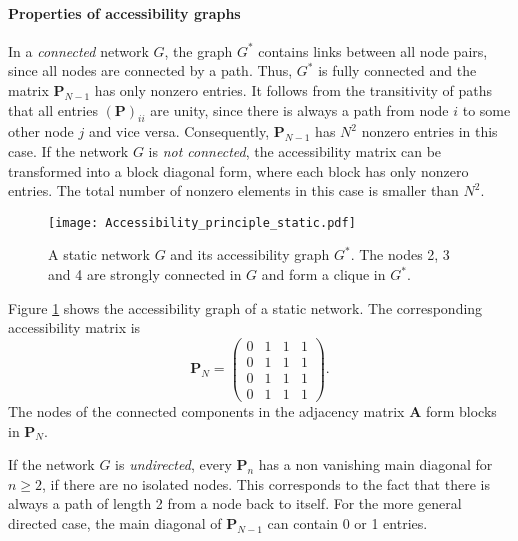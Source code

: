 \paragraph{Properties of accessibility graphs\color{Cayenne}{.}}
In a \emph{connected} network $G$, the graph $G^*$ contains links between all node pairs, since all nodes are connected by a path.
Thus, $G^*$ is fully connected and the matrix $\mathbf{P}_{N-1}$ has only nonzero entries.
It follows from the transitivity of paths that all entries $(\mathbf{P})_{ii}$ are unity, since there is always a path from node $i$ to some other node $j$ and vice versa.
Consequently, $\mathbf{P}_{N-1}$ has $N^2$ nonzero entries in this case.
If the network $G$ is \emph{not connected}, the accessibility matrix can be transformed into a block diagonal form, where each block has only nonzero entries.
The total number of nonzero elements in this case is smaller than $N^2$.

%
\begin{figure}[htb]
\begin{center}
\texttt{[image: Accessibility\_principle\_static.pdf]}
\caption{A static network $G$ and its accessibility graph $G^*$.
The nodes 2, 3 and 4 are strongly connected in $G$ and form a clique in $G^*$.}
\label{fig:access_static}
\end{center}
\end{figure}
%
Figure \ref{fig:access_static} shows the accessibility graph of a static network.
The corresponding accessibility matrix is
\begin{equation*}
\mathbf{P}_N=\left(%
\begin{array}{c|ccc}%
0 & 1 & 1 & 1 \\
\hline 0 & 1 & 1 & 1 \\
0 & 1 & 1 & 1 \\
0 & 1 & 1 & 1
\end{array}\right) .
\end{equation*}
The nodes of the connected components in the adjacency matrix $\mathbf{A}$ form blocks in $\mathbf{P}_N$.

If the network $G$ is \emph{undirected}, every $\mathbf{P}_n$ has a non vanishing main diagonal for $n\geq 2$, if there are no isolated nodes.
This corresponds to the fact that there is always a path of length 2 from a node back to itself.
For the more general directed case, the main diagonal of $\mathbf{P}_{N-1}$ can contain 0 or 1 entries.

